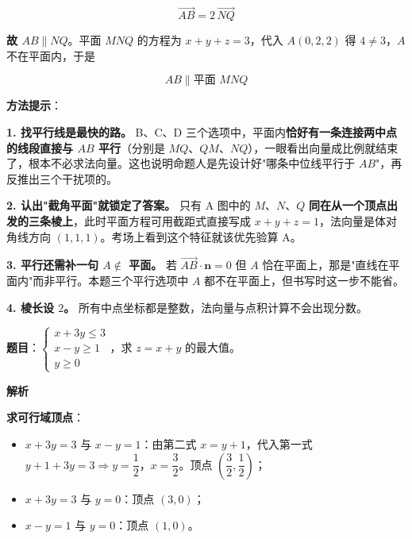 \[\overrightarrow{AB}=2\,\overrightarrow{NQ}\]

\textbf{故 $AB\parallel NQ$}。平面 $MNQ$ 的方程为 $x+y+z=3$，代入 $A(0,2,2)$ 得 $4\ne3$，$A$ 不在平面内，于是

\[AB\parallel\text{平面 }MNQ\]

\par\medskip


\begin{gktip}
\textbf{方法提示}：

\textbf{1. 找平行线是最快的路。} B、C、D 三个选项中，平面内\textbf{恰好有一条连接两中点的线段直接与 $AB$ 平行}（分别是 $MQ$、$QM$、$NQ$），一眼看出向量成比例就结束了，根本不必求法向量。这也说明命题人是先设计好"哪条中位线平行于 $AB$"，再反推出三个干扰项的。

\textbf{2. 认出"截角平面"就锁定了答案。} 只有 A 图中的 $M$、$N$、$Q$ \textbf{同在从一个顶点出发的三条棱上}，此时平面方程可用截距式直接写成 $x+y+z=1$，法向量是体对角线方向 $(1,1,1)$。考场上看到这个特征就该优先验算 A。

\textbf{3. 平行还需补一句 $A\notin$ 平面。} 若 $\overrightarrow{AB}\cdot\boldsymbol n=0$ 但 $A$ 恰在平面上，那是"直线在平面内"而非平行。本题三个平行选项中 $A$ 都不在平面上，但书写时这一步不能省。

\textbf{4. 棱长设 $2$。} 所有中点坐标都是整数，法向量与点积计算不会出现分数。
\end{gktip}

\par\medskip


\textbf{题目}：$\begin{cases}x+3y\le3\\ x-y\ge1\\ y\ge0\end{cases}$，求 $z=x+y$ 的最大值。

\textbf{解析}

\textbf{求可行域顶点}：

\begin{itemize}
\item $x+3y=3$ 与 $x-y=1$：由第二式 $x=y+1$，代入第一式 $y+1+3y=3\Rightarrow y=\dfrac12$，$x=\dfrac32$。顶点 $\left(\dfrac32,\dfrac12\right)$；
\item $x+3y=3$ 与 $y=0$：顶点 $(3,0)$；
\item $x-y=1$ 与 $y=0$：顶点 $(1,0)$。
\end{itemize}

